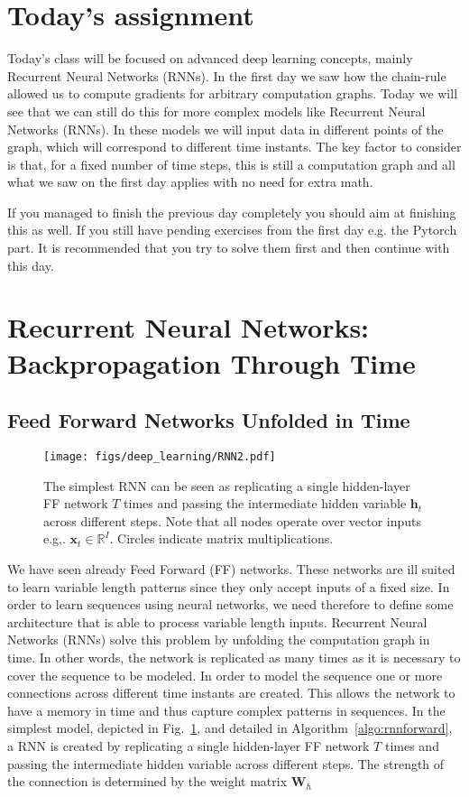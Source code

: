 \section{Today's assignment}
Today's class will be focused on advanced deep learning concepts, mainly
Recurrent Neural Networks (RNNs). In the first day we saw how the chain-rule
allowed us to compute gradients for arbitrary computation graphs. Today we will
see that we can still do this for more complex models like Recurrent Neural
Networks (RNNs). In these models we will input data in different points of the
graph, which will correspond to different time instants. The key factor to
consider is that, for a fixed number of time steps, this is still a computation
graph and all what we saw on the first day applies with no need for extra math.

If you managed to finish the previous day completely you should aim at finishing
this as well. If you still have pending exercises from the first day e.g. the
Pytorch part. It is recommended that you try to solve them first and then
continue with this day.

\section{Recurrent Neural Networks: Backpropagation Through Time}

\subsection{Feed Forward Networks Unfolded in Time}

\begin{figure}[!h]
\centering
\texttt{[image: figs/deep\_learning/RNN2.pdf]}
\caption{The simplest RNN can be seen as replicating a single hidden-layer FF
network $T$ times and passing the intermediate hidden variable $\mathbf{h}_t$
across different steps. Note that all nodes operate over vector inputs e.g,.
$\mathbf{x}_t \in \mathbb{R}^I$. Circles indicate matrix multiplications.}
\label{fig:RNN}
\end{figure}

We have seen already Feed Forward (FF) networks. These networks are ill
suited to learn variable length patterns since they only accept inputs of a
fixed size. In order to learn sequences using neural networks, we need therefore
to define some architecture that is able to process variable length inputs.
Recurrent Neural Networks (RNNs) solve this problem by unfolding the
computation graph in time. In other words, the network is replicated as many
times as it is necessary to cover the sequence to be modeled. In order
to model the sequence one or more connections across different time instants are
created. This allows the network to have a memory in time and thus capture
complex patterns in sequences. In the simplest model, depicted in
Fig.~\ref{fig:RNN}, and detailed in Algorithm~\ref{algo:rnnforward}, a RNN is
created by replicating a single hidden-layer FF network $T$ times and passing
the intermediate hidden variable across different steps. The strength of the
connection is determined by the weight matrix $\mathbf{W}_h$

